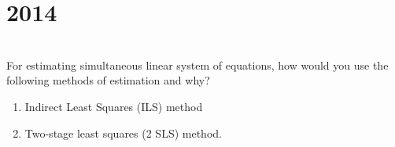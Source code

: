 \section*{2014}
\vspace{-.5cm}
\hrulefill \smallskip\\
 For estimating simultaneous linear system of equations, how would you use the following methods of estimation and why?
\begin{enumerate}[itemsep = 0ex,label=(\roman*)]
    \item Indirect Least Squares (ILS) method
    \item Two-stage least squares (2 SLS) method.
\end{enumerate}